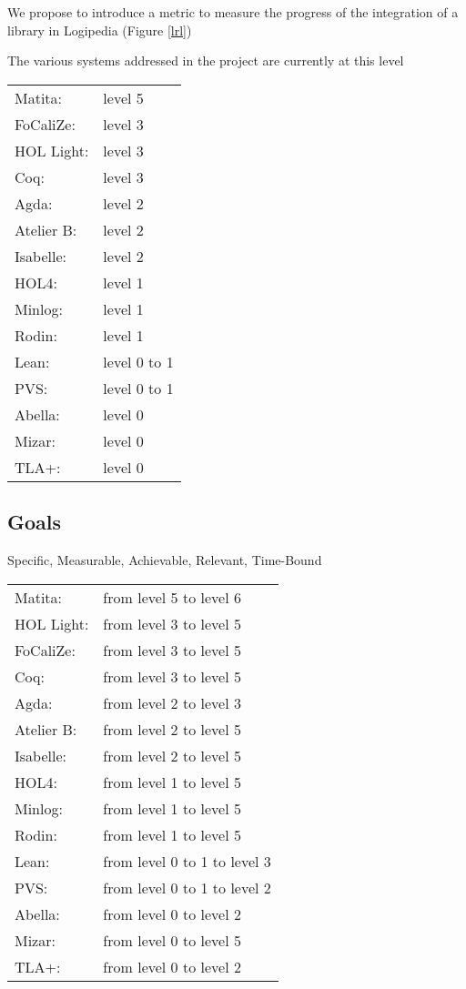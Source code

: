 We propose to introduce a metric to measure the progress of the
integration of a library in Logipedia (Figure \ref{lrl})

The various systems addressed in the project are currently at this level 

\begin{tabular}{ll}
Matita:& level 5\\
FoCaliZe:& level 3\\
HOL Light:& level 3\\
Coq:& level 3\\
Agda:& level 2\\
Atelier B:& level 2\\
Isabelle:& level 2\\
HOL4:& level 1\\
Minlog:& level 1\\
Rodin:& level 1\\
Lean:& level 0 to 1\\
PVS:& level 0 to 1\\
Abella:& level 0\\
Mizar:& level 0\\
TLA+:& level 0
\end{tabular}

\subsection{Goals}

Specific, Measurable, Achievable, Relevant, Time-Bound

\begin{tabular}{ll}
Matita:& from level 5 to level 6\\
HOL Light:& from level 3 to level 5\\
FoCaliZe:& from level 3 to level 5\\
Coq:& from level 3 to level 5\\
Agda:& from level 2 to level 3\\
Atelier B:& from level 2 to level 5\\
Isabelle:& from level 2 to level 5\\
HOL4:& from level 1 to level 5\\
Minlog:& from level 1 to level 5\\
Rodin:& from level 1 to level 5\\
Lean:& from level 0 to 1 to level 3\\
PVS:& from level 0 to 1 to level 2\\
Abella:& from level 0 to level 2\\
Mizar:& from level 0 to level 5\\
TLA+:& from level 0 to level 2
\end{tabular}


